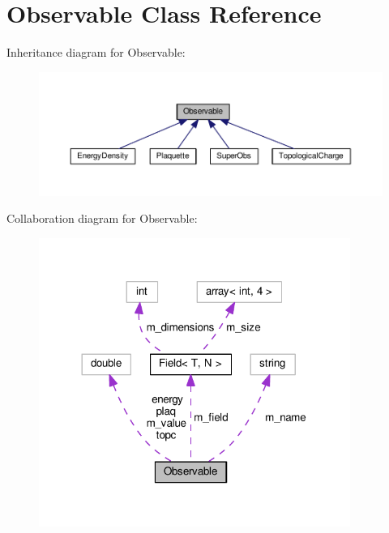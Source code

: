 \hypertarget{classObservable}{}\section{Observable Class Reference}
\label{classObservable}


Inheritance diagram for Observable\+:\nopagebreak
\begin{figure}[H]
\begin{center}
\leavevmode
\includegraphics[width=350pt]{classObservable__inherit__graph}
\end{center}
\end{figure}


Collaboration diagram for Observable\+:\nopagebreak
\begin{figure}[H]
\begin{center}
\leavevmode
\includegraphics[width=288pt]{classObservable__coll__graph}
\end{center}
\end{figure}

